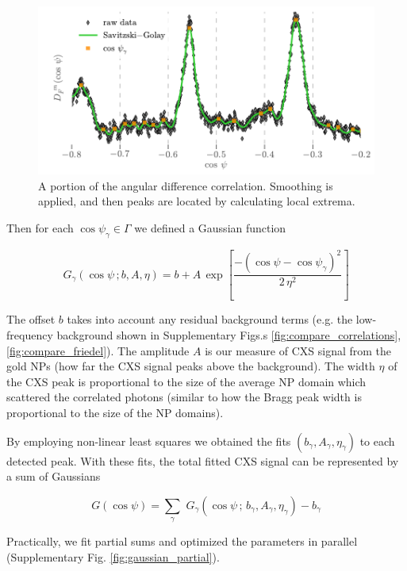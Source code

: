 \documentclass [12pt,fleqn]{article}
\def \be {\begin{equation}}
\def \ee {\end{equation}}
\begin{document}
\begin{figure}[H]
\includegraphics[]{supp_figs/peak_detection.pdf}
\caption{A portion of the angular difference correlation. Smoothing is applied, and then peaks are located by calculating local extrema.}
\label{fig:peak_detection}
\end{figure}

Then for each $\cos \psi_\gamma \in \Gamma$ we defined a Gaussian function

\be
G_\gamma (\cos \psi \,;  b,A, \eta)  =  b +  A\,\exp \left [ \frac{-\left( \cos \psi - \cos\psi_\gamma \right)^2}  {2\,\eta^2}  \right ]
\ee

The offset $b$ takes into account any residual background terms (e.g. the low-frequency background shown in Supplementary Figs.s \ref{fig:compare_correlations},  \ref{fig:compare_friedel}). The amplitude $A$ is our measure of CXS signal from the gold NPs (how far the CXS signal peaks above the background). The width $\eta$ of the CXS peak is proportional to the size of the average NP domain which scattered the correlated photons (similar to how the Bragg peak width is proportional to the size of the NP domains).

By employing non-linear least squares we obtained the fits $(b_\gamma, A_\gamma, \eta_\gamma)$ to each detected peak. With these fits, the total fitted CXS signal can be represented by a sum of Gaussians

\be \label{fit}
G(\cos \psi) = \sum_\gamma \,\,G_\gamma ( \cos \psi \,;\, b_\gamma, A_\gamma, \eta_\gamma) - b_\gamma
\ee

Practically, we fit partial sums and optimized the parameters in parallel (Supplementary Fig. \ref{fig:gaussian_partial}).
\end{document}
